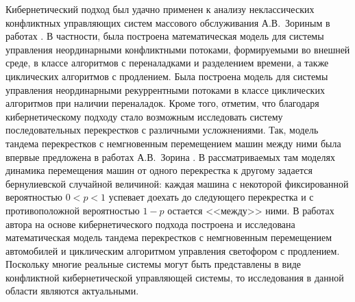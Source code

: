 Кибернетический подход был удачно применен к анализу неклассических конфликтных управляющих систем массового обслуживания А.В.~Зориным в работах \cite{Zorin:2003,Zorin:2006,Zorin:2008:2,Zorin:2009:1,Zorin:2009:2,Zorin:2010:1,Zorin:2010:2,Zorin:2011:1,Zorin:2011:2,Zorin:2013 ,Zorin:2014:1,Zorin:2014:2,Zorin:2012:1, Zorin:2014:3}. В частности, была построена математическая модель для системы управления неординарными конфликтными потоками, формируемыми во внешней среде, в классе алгоритмов с переналадками и разделением времени, а также циклических алгоритмов с продлением. Была построена модель для системы управления неординарными рекуррентными потоками в классе циклических алгоритмов при наличии переналадок. Кроме того, отметим, что благодаря кибернетическому подходу стало возможным исследовать систему последовательных перекрестков с различными усложнениями. Так, модель тандема перекрестков с немгновенным перемещением машин между ними была впервые предложена в работах А.В.~Зорина \cite{Zorin:2010:3, Zorin:2011:2, Zorin:2012:2}. В рассматриваемых там моделях динамика перемещения машин от одного перекрестка к другому задается бернулиевской случайной величиной: каждая машина с некоторой фиксированной вероятностью $0<p<1$ успевает доехать до следующего перекрестка и с противоположной вероятностью $1-p$ остается <<между>> ними. В работах автора \cite{ORM2018, DCCN2017, Tomsk2017, Penza2017, DCCN2016:1, DCCN2016:2, DCCN2015, Dm2015, Minsk2015, vestnikTvGU, vestnikVGAVT2, UBS} на основе кибернетического подхода построена и исследована математическая модель тандема перекрестков с немгновенным перемещением автомобилей и циклическим алгоритмом управления светофором с продлением. Поскольку многие реальные системы могут быть представлены в виде конфликтной кибернетической управляющей системы, то исследования в данной области являются актуальными.

